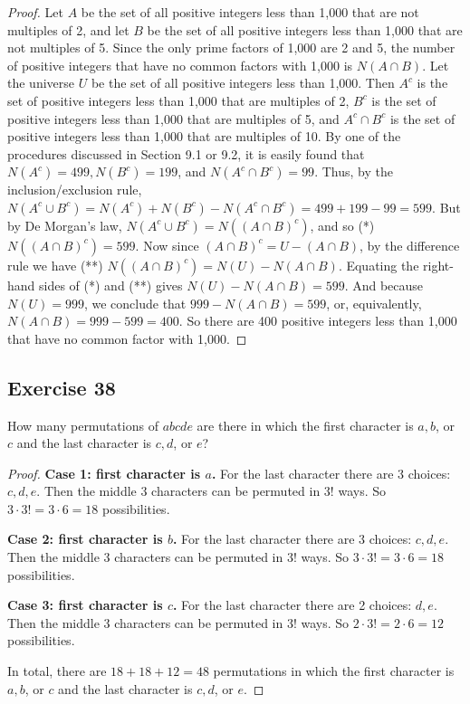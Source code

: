 \documentclass[14pt]{extarticle}
\begin{document}
\begin{proof}
     Let $A$ be the set of all positive integers less than 1,000 that are not multiples of 2, and let $B$ be the set of all
     positive integers less than 1,000 that are not multiples of 5. Since the only prime factors of 1,000 are 2 and 5, the
     number of positive integers that have no common factors with 1,000 is \(N(A \cap B)\). Let the universe $U$ be the
     set of all positive integers less than 1,000. Then \(A^c\) is the set of positive integers less than 1,000 that are
     multiples of 2, \(B^c\) is the set of positive integers less than 1,000 that are multiples of 5, and \(A^c \cap
     B^c\) is the set of positive integers less than 1,000 that are multiples of 10. By one of the procedures discussed in
     Section 9.1 or 9.2, it is easily found that \(N(A^c) = 499, N(B^c) = 199\), and \(N(A^c \cap B^c) = 99\). Thus, by the
     inclusion/exclusion rule, \(N(A^c \cup B^c) = N(A^c) + N(B^c) - N(A^c \cap B^c) = 499 + 199 - 99 = 599\). But by
     De Morgan’s law, \(N(A^c \cup B^c) = N((A \cap B)^c)\), and so (*) \(N((A \cap B)^c) = 599\). Now since \((A \cap B)^c
     = U - (A \cap B)\), by the difference rule we have (**) \(N((A \cap B)^c) = N(U) - N(A \cap B)\). Equating the
     right-hand sides of (*) and (**) gives \(N(U) - N(A \cap B) = 599\). And because \(N(U) = 999\), we conclude that \(999
     - N(A \cap B) = 599\), or, equivalently, \(N(A \cap B) = 999 - 599 = 400\). So there are 400 positive integers less
     than 1,000 that have no common factor with 1,000.
\end{proof}

\subsection{Exercise 38}
How many permutations of \(abcde\) are there in which the first character is \(a, b\), or $c$ and the last character is \(c, d\), or $e$?

\begin{proof}
     {\bf Case 1: first character is $a$.} For the last character there are 3 choices: \(c, d, e\). Then the middle
     3 characters can be permuted in \(3!\) ways. So \(3 \cdot 3! = 3 \cdot 6 = 18\) possibilities.

          {\bf Case 2: first character is $b$.} For the last character there are 3 choices: \(c, d, e\). Then the middle
     3 characters can be permuted in \(3!\) ways. So \(3 \cdot 3! = 3 \cdot 6 = 18\) possibilities.

          {\bf Case 3: first character is $c$.} For the last character there are 2 choices: \(d, e\). Then the middle
     3 characters can be permuted in \(3!\) ways. So \(2 \cdot 3! = 2 \cdot 6 = 12\) possibilities.

     In total, there are \(18+18+12 = 48\) permutations in which the first character is \(a, b\), or $c$ and the last
     character is \(c, d\), or $e$.
\end{proof}
\end{document}
